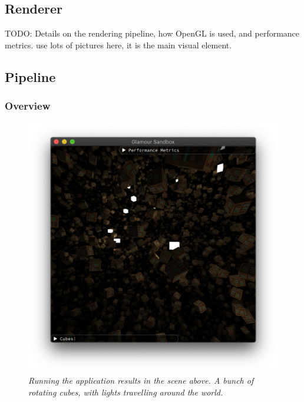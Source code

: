 \begin{multicols}{2}
  \section{Renderer}\label{renderer}

  TODO: Details on the rendering pipeline, how OpenGL is used, and performance metrics.
  use lots of pictures here, it is the main visual element.

  \subsection{Pipeline}

  \subsubsection{Overview}


  \begin{figure}[H]
    \includegraphics[width=1\columnwidth]{../sandbox.png}
    \caption[Sandbox screenshot]{
      \emph{
        Running the application results in the scene above.
        A bunch of rotating cubes, with lights travelling around the world.
      }
    }\label{fig:sandbox-screenshot}
  \end{figure}


\end{multicols}
